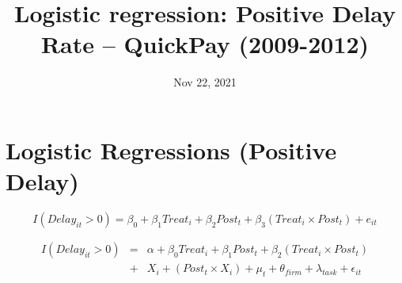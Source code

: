 \documentclass[
]{article}
\title{Logistic regression: Positive Delay Rate -- QuickPay (2009-2012)}
\author{}
\date{\vspace{-2.5em}Nov 22, 2021}
\begin{document}
\maketitle

\hypertarget{logistic-regressions-positive-delay}{%
\section{Logistic Regressions (Positive
Delay)}\label{logistic-regressions-positive-delay}}

\[ I(Delay_{it}>0) = \beta_0 + \beta_1 Treat_i + \beta_2 Post_t + \beta_3 (Treat_i \times Post_t) + e_{it}\]

\[ \begin{aligned} I(Delay_{it}>0) &=& \alpha+\beta_0 Treat_i + \beta_1 Post_t + \beta_2 (Treat_i \times Post_t)\\
&+&  X_i + (Post_t \times X_i) + \mu_t + \theta_{firm} + \lambda_{task}+ \epsilon_{it}
\end{aligned}\]
\end{document}
